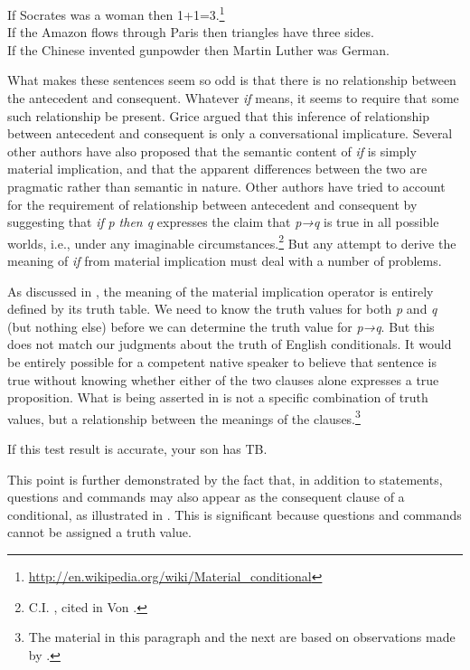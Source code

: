 \ea
\ea If Socrates was a woman then 1+1=3.\footnote{\url{http://en.wikipedia.org/wiki/Material_conditional}} \\
\ex If the Amazon flows through Paris then triangles have three sides.\\
\ex If the Chinese invented gunpowder then Martin Luther was German.
                       \z
\z


What makes these sentences seem so odd is that there is no relationship between the antecedent and consequent. Whatever \textit{if} means, it seems to require that some such relationship be present. Grice argued that this inference of relationship between antecedent and consequent is only a conversational implicature. Several other authors have also proposed that the semantic content of \textit{if} is simply material implication, and that the apparent differences between the two are pragmatic rather than semantic in nature. Other authors have tried to account for the requirement of relationship between antecedent and consequent by suggesting that \textit{if} \textit{p then q} expresses the claim that \textit{p→q} is true in all possible worlds, i.e., under any imaginable circumstances.\footnote{C.I. \citet{Lewis1918}, cited in Von \citet{Fintel2011}.} But any attempt to derive the meaning of \textit{if} from material implication must deal with a number of problems.



As discussed in , the meaning of the material implication operator is entirely defined by its truth table. We need to know the truth values for both \textit{p} and \textit{q} (but nothing else) before we can determine the truth value for \textit{p→q}. But this does not match our judgments about the truth of English conditionals. It would be entirely possible for a competent native speaker to believe that sentence  is true without knowing whether either of the two clauses alone expresses a true proposition. What is being asserted in  is not a specific combination of truth values, but a relationship between the meanings of the clauses.\footnote{The material in this paragraph and the next are based on observations made by \citet{Podlesskaya2001}.}


\ea
If this test result is accurate, your son has TB.
\z


This point is further demonstrated by the fact that, in addition to statements, questions and commands may also appear as the consequent clause of a conditional, as illustrated in . This is significant because questions and commands cannot be assigned a truth value.


